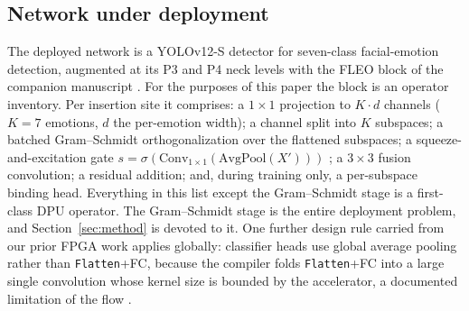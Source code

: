 \documentclass[onecolumn,journal]{IEEEtran}
\newcommand{\Conv}{\mathrm{Conv}}
\begin{document}
\subsection{Network under deployment}\label{sec:network}
The deployed network is a YOLOv12-S detector \cite{tian2025yolov12} for seven-class
facial-emotion detection, augmented at its P3 and P4 neck levels with the FLEO block of
the companion manuscript \cite{askri2026fleo}. For the purposes of this paper the block
is an operator inventory. Per insertion site it comprises: a $1{\times}1$ projection to
$K\!\cdot\! d$ channels ($K{=}7$ emotions, $d$ the per-emotion width); a channel split
into $K$ subspaces; a batched Gram--Schmidt orthogonalization over the flattened
subspaces; a squeeze-and-excitation gate
$s=\sigma(\Conv_{1\times1}(\mathrm{AvgPool}(X')))$ \cite{hu2018se}; a $3{\times}3$
fusion convolution; a residual addition; and, during training only, a per-subspace
binding head. Everything in this list except the Gram--Schmidt stage is a first-class
DPU operator. The Gram--Schmidt stage is the entire deployment problem, and
Section~\ref{sec:method} is devoted to it. One further design rule carried from our
prior FPGA work applies globally: classifier heads use global average pooling rather
than \texttt{Flatten}+FC, because the compiler folds \texttt{Flatten}+FC into a large
single convolution whose kernel size is bounded by the accelerator, a documented
limitation of the flow \cite{amd_pg338}.
\end{document}
